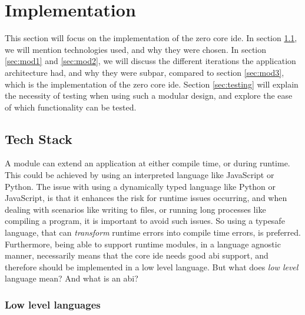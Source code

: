 \chapter{Implementation} \label{cha:impl}

This section will focus on the implementation of the zero core \gls{ide}. In
section \ref{sec:stack}, we will mention technologies used, and why they were
chosen. In section \ref{sec:mod1} and \ref{sec:mod2}, we will discuss the
different iterations the application architecture had, and why they were subpar,
compared to section \ref{sec:mod3}, which is the implementation of the zero core
\gls{ide}. Section \ref{sec:testing} will explain the necessity of testing when
using such a modular design, and explore the ease of which functionality can be
tested.

\section{Tech Stack} \label{sec:stack}

A module can extend an application at either compile time, or during runtime.
This could be achieved by using an interpreted language like JavaScript or
Python. The issue with using a dynamically typed language like Python or
JavaScript, is that it enhances the risk for runtime issues occurring, and when
dealing with scenarios like writing to files, or running long processes like
compiling a program, it is important to avoid such issues. So using a typesafe
language, that can \textit{transform} runtime errors into compile time errors,
is preferred. Furthermore, being able to support runtime modules, in a language
agnostic manner, necessarily means that the core \gls{ide} needs good
\gls{abi} support, and therefore should be implemented in a low level language.
But what does \textit{low level} language mean? And what is an \gls{abi}?

\subsection{Low level languages}

